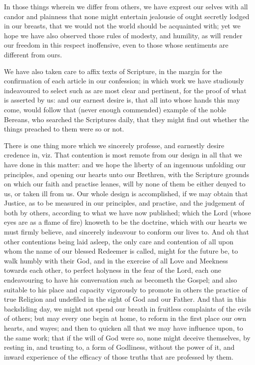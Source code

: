 \documentclass[12pt,a4paper]{book}
\begin{document}
In those things wherein we differ from others, we have exprest our selves with all candor and plainness that none might entertain jealousie of ought secretly lodged in our breasts, that we would not the world should be acquainted with; yet we hope we have also observed those rules of modesty, and humility, as will render our freedom in this respect inoffensive, even to those whose sentiments are different from ours.

We have also taken care to affix texts of Scripture, in the margin for the confirmation of each article in our confession; in which work we have studiously indeavoured to select such as are most clear and pertinent, for the proof of what is asserted by us: and our earnest desire is, that all into whose hands this may come, would follow that (never enough commended) example of the noble Bereans, who searched the Scriptures daily, that they might find out whether the things preached to them were so or not.

There is one thing more which we sincerely professe, and earnestly desire credence in, viz. That contention is most remote from our design in all that we have done in this matter: and we hope the liberty of an ingenuous unfolding our principles, and opening our hearts unto our Brethren, with the Scripture grounds on which our faith and practise leanes, will by none of them be either denyed to us, or taken ill from us. Our whole design is accomplished, if we may obtain that Justice, as to be measured in our principles, and practise, and the judgement of both by others, according to what we have now published; which the Lord (whose eyes are as a flame of fire) knoweth to be the doctrine, which with our hearts we must firmly believe, and sincerely indeavour to conform our lives to. And oh that other contentions being laid asleep, the only care and contention of all upon whom the name of our blessed Redeemer is called, might for the future be, to walk humbly with their God, and in the exercise of all Love and Meekness towards each other, to perfect holyness in the fear of the Lord, each one endeavouring to have his conversation such as becometh the Gospel; and also suitable to his place and capacity vigorously to promote in others the practice of true Religion and undefiled in the sight of God and our Father. And that in this backsliding day, we might not spend our breath in fruitless complaints of the evils of others; but may every one begin at home, to reform in the first place our own hearts, and wayes; and then to quicken all that we may have influence upon, to the same work; that if the will of God were so, none might deceive themselves, by resting in, and trusting to, a form of Godliness, without the power of it, and inward experience of the efficacy of those truths that are professed by them.
\end{document}

